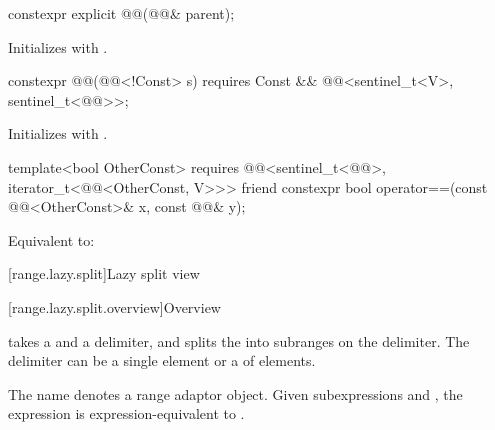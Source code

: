 %
\begin{itemdecl}
constexpr explicit @@(@@& parent);
\end{itemdecl}

\begin{itemdescr}
\pnum
\effects
Initializes  with .
\end{itemdescr}

%
\begin{itemdecl}
constexpr @@(@@<!Const> s)
  requires Const && @@<sentinel_t<V>, sentinel_t<@@>>;
\end{itemdecl}

\begin{itemdescr}
\pnum
\effects
Initializes  with .
\end{itemdescr}


\begin{itemdecl}
template<bool OtherConst>
  requires @@<sentinel_t<@@>, iterator_t<@@<OtherConst, V>>>
friend constexpr bool operator==(const @@<OtherConst>& x, const @@& y);
\end{itemdecl}

\begin{itemdescr}
\pnum
\effects
Equivalent to: 
\end{itemdescr}

[range.lazy.split]{Lazy split view}

[range.lazy.split.overview]{Overview}

\pnum
{} takes a  and a delimiter, and splits
the  into subranges on the delimiter. The delimiter can be
a single element or a  of elements.

\pnum
{}%
The name  denotes a
range adaptor object.
Given subexpressions  and ,
the expression  is expression-equivalent to
.

